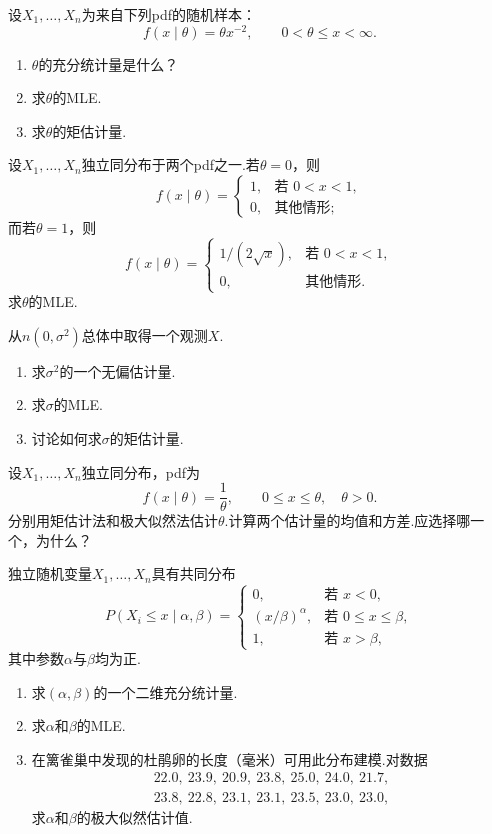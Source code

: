 \begin{exercise}\label{exercise:7.6}
设$X_1,\ldots,X_n$为来自下列pdf的随机样本：
$$f(x\mid\theta)=\theta x^{-2},\qquad0<\theta\le x<\infty.$$
\begin{enumerate}[label=(\alph*)]
\item $\theta$的充分统计量是什么？
\item 求$\theta$的MLE.
\item 求$\theta$的矩估计量.
\end{enumerate}
\end{exercise}
\begin{exercise}\label{exercise:7.7}
设$X_1,\ldots,X_n$独立同分布于两个pdf之一.若$\theta=0$，则
$$f(x\mid\theta)=\begin{cases}1,&\text{若 }0<x<1,\\0,&\text{其他情形};\end{cases}$$
而若$\theta=1$，则
$$f(x\mid\theta)=\begin{cases}1/(2\sqrt x),&\text{若 }0<x<1,\\0,&\text{其他情形}.\end{cases}$$
求$\theta$的MLE.
\end{exercise}
\begin{exercise}\label{exercise:7.8}
从$n(0,\sigma^2)$总体中取得一个观测$X$.
\begin{enumerate}[label=(\alph*)]
\item 求$\sigma^2$的一个无偏估计量.
\item 求$\sigma$的MLE.
\item 讨论如何求$\sigma$的矩估计量.
\end{enumerate}
\end{exercise}
\begin{exercise}\label{exercise:7.9}
设$X_1,\ldots,X_n$独立同分布，pdf为
$$f(x\mid\theta)=\frac1\theta,\qquad0\le x\le\theta,\quad\theta>0.$$
分别用矩估计法和极大似然法估计$\theta$.计算两个估计量的均值和方差.应选择哪一个，为什么？
\end{exercise}
\begin{exercise}\label{exercise:7.10}
独立随机变量$X_1,\ldots,X_n$具有共同分布
$$P(X_i\le x\mid\alpha,\beta)=\begin{cases}0,&\text{若 }x<0,\\(x/\beta)^\alpha,&\text{若 }0\le x\le\beta,\\1,&\text{若 }x>\beta,\end{cases}$$
其中参数$\alpha$与$\beta$均为正.
\begin{enumerate}[label=(\alph*)]
\item 求$(\alpha,\beta)$的一个二维充分统计量.
\item 求$\alpha$和$\beta$的MLE.
\item{}\label{itm:exercise:7.10:c} 在篱雀巢中发现的杜鹃卵的长度（毫米）可用此分布建模.对数据
\begin{gather*}
22.0,\ 23.9,\ 20.9,\ 23.8,\ 25.0,\ 24.0,\ 21.7,\\
23.8,\ 22.8,\ 23.1,\ 23.1,\ 23.5,\ 23.0,\ 23.0,
\end{gather*}
求$\alpha$和$\beta$的极大似然估计值.
\end{enumerate}
\end{exercise}
